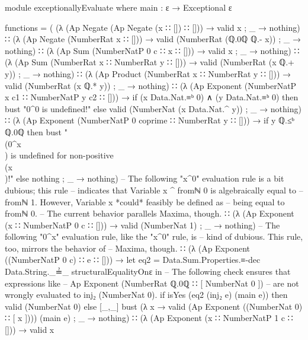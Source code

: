 \documentclass{report}
\begin{document}
\begin{code}
  module exceptionallyEvaluate where
    main : ε → Exceptional ε

    functions =
      ( (λ { (Ap Negate (Ap Negate (x ∷ []) ∷ [])) → valid x
           ; _ → nothing})
      ∷ (λ { (Ap Negate (NumberRat x ∷ [])) → valid (NumberRat (ℚ.0ℚ ℚ.- x))
           ; _ → nothing})
      ∷ (λ { (Ap Sum (NumberNatP 0 c ∷ x ∷ [])) → valid x
           ; _ → nothing})
      ∷ (λ { (Ap Sum (NumberRat x ∷ NumberRat y ∷ [])) →
             valid (NumberRat (x ℚ.+ y))
           ; _ → nothing})
      ∷ (λ { (Ap Product (NumberRat x ∷ NumberRat y ∷ [])) →
             valid (NumberRat (x ℚ.* y))
           ; _ → nothing})
      ∷ (λ { (Ap Exponent (NumberNatP x c1 ∷ NumberNatP y c2 ∷ [])) →
             if (x Data.Nat.≡ᵇ 0) ∧ (y Data.Nat.≡ᵇ 0)
               then bust "0^0 is undefined!"
               else valid (NumberNat (x Data.Nat.^ y))
           ; _ → nothing})
      ∷ (λ { (Ap Exponent (NumberNatP 0 coprime ∷ NumberRat y ∷ [])) →
             if y ℚ.≤ᵇ ℚ.0ℚ
                then bust "\\(0^x\\) is undefined for non-positive \\(x\\)!"
                else nothing
           ; _ → nothing})
      -- The following "x^0" evaluation rule is a bit dubious; this rule
      -- indicates that Variable x ^ fromℕ 0 is algebraically equal to
      -- fromℕ 1.  However, Variable x *could* feasibly be defined as
      -- being equal to fromℕ 0.
      -- The current behavior parallels Maxima, though.
      ∷ (λ { (Ap Exponent (x ∷ NumberNatP 0 c ∷ [])) → valid (NumberNat 1)
           ; _ → nothing})
      -- The following "0^x" evaluation rule, like the "x^0" rule, is
      -- kind of dubious.  This rule, too, mirrors the behavior of
      -- Maxima, though.
      ∷ (λ { (Ap Exponent ((NumberNatP 0 c) ∷ e ∷ [])) →
             let eq2 = Data.Sum.Properties.≡-dec Data.String._≟_
                                                 structuralEqualityOnε in
             -- The following check ensures that expressions like
             -- Ap Exponent (NumberRat ℚ.0ℚ ∷ [ NumberNat 0 ])
             -- are not wrongly evaluated to inj₂ (NumberNat 0).
             if isYes (eq2 (inj₂ e) (main e))
                then valid (NumberNat 0)
                else [_,_] bust
                           (λ x → valid (Ap Exponent ((NumberNat 0) ∷ [ x ])))
                           (main e)
           ; _ → nothing})
      ∷ (λ { (Ap Exponent (x ∷ NumberNatP 1 c ∷ [])) → valid x
}
\end{code}
\end{document}
